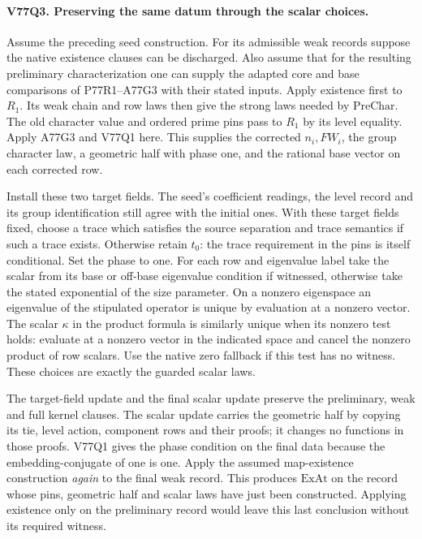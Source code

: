 \paragraph{V77Q3. Preserving the same datum through the scalar choices.}
Assume the preceding seed construction. For its admissible weak
records suppose the native existence clauses can be discharged.
Also assume that for the resulting preliminary characterization
one can supply the adapted core and base comparisons of
P77R1--A77G3 with their stated inputs. Apply existence first to
$R_1$. Its weak chain and row laws then give the strong laws needed
by $\mathrm{PreChar}$. The old character value and ordered prime
pins pass to $R_1$ by its level equality. Apply A77G3 and V77Q1
here. This supplies the corrected $n_i,FW_i$, the group character
law, a geometric half with phase one, and the rational base vector
on each corrected row.

Install these two target fields. The seed's coefficient readings,
the level record and its group identification still agree with the
initial ones. With these target fields fixed, choose a trace which
satisfies the source separation and trace semantics if such a trace
exists. Otherwise retain $t_0$: the trace requirement in the pins is
itself conditional. Set the phase to one. For each row and
eigenvalue label take the scalar from its base or off-base eigenvalue
condition if witnessed, otherwise take the stated exponential
of the size parameter. On a nonzero eigenspace an eigenvalue of
the stipulated operator is unique by evaluation at a nonzero
vector. The scalar $\kappa$ in the product formula is similarly
unique when its nonzero test holds: evaluate at a nonzero vector
in the indicated space and cancel the nonzero product of row
scalars. Use the native zero fallback if this test has no witness.
These choices are exactly the guarded scalar laws.

The target-field update and the final scalar update preserve the
preliminary, weak and full kernel clauses. The scalar update carries
the geometric half by copying its tie, level action, component rows
and their proofs; it changes no functions in those proofs. V77Q1
gives the phase condition on the final data because the
embedding-conjugate of one is one. Apply the assumed
map-existence construction \emph{again} to the final weak record.
This produces $\mathrm{ExAt}$ on the record whose pins, geometric
half and scalar laws have just been constructed. Applying existence
only on the preliminary record would leave this last conclusion
without its required witness.
